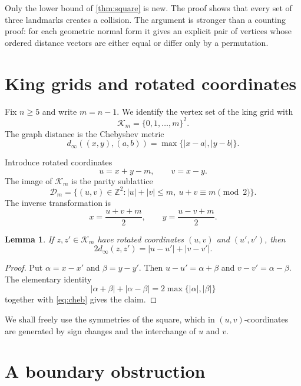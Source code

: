 \documentclass[11pt]{amsart}
\newtheorem{lemma}[lemma]{Lemma}
\theoremstyle{remark}
\newcommand{\dist}{d}
\newcommand{\King}{\mathcal K}
\newcommand{\D}{\mathcal D}
\begin{document}
Only the lower bound of \cref{thm:square} is new.  The proof shows that every set of three landmarks creates a collision.  The argument is stronger than a counting proof: for each geometric normal form it gives an explicit pair of vertices whose ordered distance vectors are either equal or differ only by a permutation.

\section{King grids and rotated coordinates}\label{sec:rotated}

Fix $n\ge 5$ and write $m=n-1$.  We identify the vertex set of the king grid with
\[
 \King_m=\{0,1,\dots,m\}^2.
\]
The graph distance is the Chebyshev metric
\begin{equation}\label{eq:cheb}
 \dist_\infty((x,y),(a,b))=\max\{|x-a|,|y-b|\}.
\end{equation}

Introduce rotated coordinates
\begin{equation}\label{eq:rotation}
 u=x+y-m,
 \qquad
 v=x-y.
\end{equation}
The image of $\King_m$ is the parity sublattice
\begin{equation}\label{eq:diamond}
 \D_m=\{(u,v)\in\mathbb Z^2: |u|+|v|\le m,\ u+v\equiv m\pmod 2\}.
\end{equation}
The inverse transformation is
\begin{equation}\label{eq:inverse}
 x=\frac{u+v+m}{2},
 \qquad
 y=\frac{u-v+m}{2}.
\end{equation}

\begin{lemma}\label{lem:l1}
If $z,z'\in\King_m$ have rotated coordinates $(u,v)$ and $(u',v')$, then
\[
 2\dist_\infty(z,z')=|u-u'|+|v-v'|.
\]
\end{lemma}

\begin{proof}
Put $\alpha=x-x'$ and $\beta=y-y'$.  Then $u-u'=\alpha+\beta$ and $v-v'=\alpha-\beta$.  The elementary identity
\[
 |\alpha+\beta|+|\alpha-\beta|=2\max\{|\alpha|,|\beta|\}
\]
together with \eqref{eq:cheb} gives the claim.
\end{proof}

We shall freely use the symmetries of the square, which in $(u,v)$-coordinates are generated by sign changes and the interchange of $u$ and $v$.

\section{A boundary obstruction}\label{sec:boundary}
\end{document}
